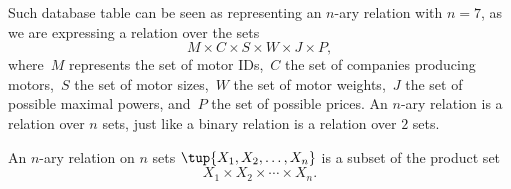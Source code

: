 \begin{table}[h]
  \centering
  \caption{A simplified catalogue of motors.}
  \label{tab:electric_motors}
\end{table}



Such database table can be seen as representing an $n$-ary relation with $n = 7$, as we are expressing a relation
over the sets
\begin{equation*}
  M\times C\times S\times W\times J\times P,
\end{equation*}
where~$M$ represents the set of motor IDs,~$C$ the set of companies producing motors,~$S$ the set of motor sizes,~$W$ the set of motor weights,~$J$ the set of possible maximal powers, and~$P$ the set of possible prices. An $n$-ary relation is a relation over $n$ sets, just like a binary relation is a
relation over $2$ sets.
\begin{definition}
  An $n$-ary relation on $n$ sets $\tup{X_1, X_2, \dots, X_n}$ is a
  subset of the product set
  \begin{equation}
    X_1 \times X_2 \times \cdots \times X_n.
  \end{equation}
\end{definition}


